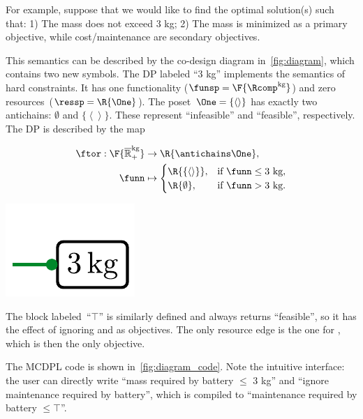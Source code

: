 For example, suppose that we would like to find the optimal solution(s)
such that: 1) The mass does not exceed 3 kg; 2) The mass is minimized
as a primary objective, while cost/maintenance are secondary objectives.

This semantics can be described by the co-design diagram in~\cref{fig:diagram},
which contains two new symbols. The DP labeled ``3 kg'' implements
the semantics of hard constraints. It has one functionality ($\funsp=\F{\Rcomp^{\text{kg}}}$)
and zero resources~($\ressp=\R{\One}$). The poset~$\One=\{\left\langle \right\rangle \}$
has exactly two antichains: $\emptyset$ and $\{\left\langle \right\rangle \}$.
These represent ``infeasible'' and ``feasible'', respectively.
The DP is described by the map

\quad\quad
\begin{minipage}[c]{5cm}
\begin{align*}
\ftor:\F{\mathbb{\overline{R}}_{+}^{\text{kg}}} & \rightarrow\R{\antichains\One},\\
\funn& \mapsto\begin{cases}
\R{\{\left\langle \right\rangle \}}, & \text{if }\funn\leq\text{3 kg},\\
\R{\emptyset}, & \text{if }\funn>\text{3 kg}.
\end{cases}
\end{align*}

\end{minipage}\quad\includegraphics[scale=0.45]{papers/arxiv_submission_v6/batteries_3kg.pdf}

\smallskip{}

\noindent The block labeled~``$\top$'' is similarly defined and
always returns ``feasible'', so it has the effect of ignoring 
and  as objectives. The only resource edge is the
one for , which is then the only objective.

The MCDPL code is shown in~\cref{fig:diagram_code}. Note the intuitive
interface: the user can directly write ``mass required by battery
$\leq$ 3 kg'' and ``ignore maintenance required by battery'',
which is compiled to ``maintenance required by battery $\leq\top$''.

